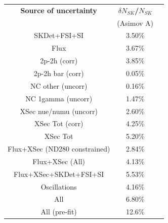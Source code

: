 \begin{table}[htb]
\centering
\begin{tabular}{| c | c | c |}
\hline
  {\bf Source of uncertainty}    & \multicolumn{1}{c|}{{\bf ${\delta}N_{SK}$/$N_{SK}$}}\\
                                 & \multicolumn{1}{c|}{(Asimov A)}\\

\hline
\hline  SKDet+FSI+SI                   & 3.50\%                        \\
\hline
\hline
  Flux                           & 3.67\%                        \\
\hline
\hline
  2p-2h (corr)                     & 3.85\%                        \\
  2p-2h bar (corr)                  & 0.05\%                        \\
  NC other (uncorr)              & 0.16\%                        \\
  NC 1gamma (uncorr)             & 1.47\%                        \\
  XSec nue/numu (uncorr)                 & 2.60\%                        \\
\hline
  XSec Tot (corr)                  & 4.25\%                        \\
  XSec Tot                       & 5.20\%                        \\
\hline
\hline
  Flux+XSec (ND280 constrained)                      & 2.84\%                        \\
  Flux+XSec  (All)                     & 4.13\%                        \\
\hline
  Flux+XSec+SKDet+FSI+SI         & 5.53\%                        \\
\hline
\hline
  Oscillations                   & 4.16\%                        \\
\hline
\hline
  All                            & 6.80\%                        \\
  All (pre-fit) 		& 12.6\%				\\
\hline
\hline


\end{tabular}
\end{table}
